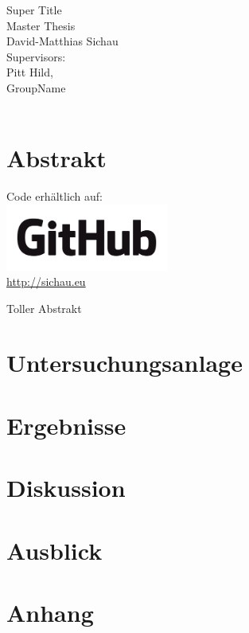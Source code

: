 \documentclass[12pt,oneside,  DIV13]{scrbook}
\newcommand{\github}[1] {
  \begin{mdframed}
  \begin{center}
  Code erhältlich auf:\\
  \href{#1}{
    \includegraphics[width=0.4\textwidth]{graphics/GitHubLogo.png}
    }\\
    \vspace{-0.3cm}
    {\tiny \href{#1}{#1}}
  \end{center}
  
  \end{mdframed}
}
\begin{document}
\frontmatter

\begin{titlepage}
	\vspace*{2cm}
	\begin{center}
		{\LARGE Super Title \vspace*{2cm}\\ Master Thesis\\}
		\vspace*{2cm}\large David-Matthias Sichau \\
		\vspace*{1.5cm} Supervisors:\\ Pitt Hild, \\
		\vspace*{1cm} GroupName\\
		\vspace*{2cm}{\large 24. September 2014, Zürich}\\
	\end{center}
\end{titlepage}



\frontmatter 
\tableofcontents



\chapter*{Abstrakt}




\github{http://sichau.eu}


Toller Abstrakt

\mainmatter









\chapter{Untersuchungsanlage}

\chapter{Ergebnisse}

\chapter{Diskussion}

\chapter{Ausblick}

\nocite{Gut2013a}
\nocite{Metzger2013}
\appendix 



\backmatter	

\printbibliography[heading=bibintoc]

\chapter{Anhang}
\end{document}
